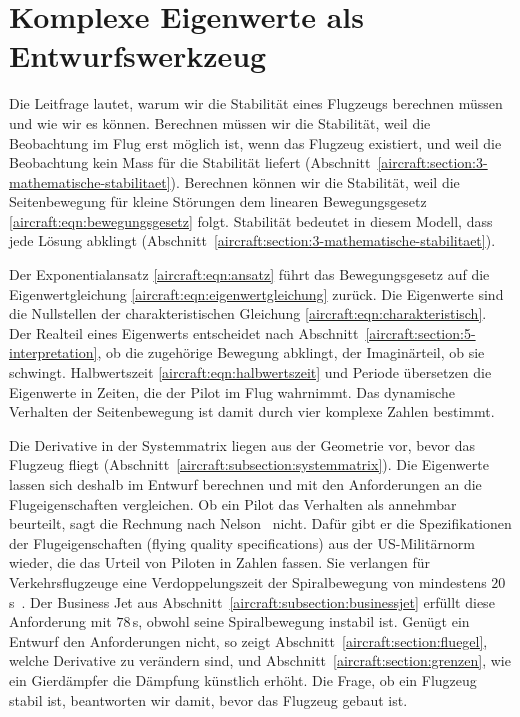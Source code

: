 %
%
%
%
%
\section{Komplexe Eigenwerte als Entwurfswerkzeug
\label{aircraft:section:fazit}}
Die Leitfrage lautet, warum wir die Stabilität eines Flugzeugs berechnen
müssen und wie wir es können.
Berechnen müssen wir die Stabilität, weil die Beobachtung im Flug erst möglich
ist, wenn das Flugzeug existiert, und weil die Beobachtung kein Mass für die
Stabilität liefert (Abschnitt~\ref{aircraft:section:3-mathematische-stabilitaet}).
Berechnen können wir die Stabilität, weil die Seitenbewegung für kleine
Störungen dem linearen Bewegungsgesetz \eqref{aircraft:eqn:bewegungsgesetz}
folgt.
Stabilität bedeutet in diesem Modell, dass jede Lösung abklingt
(Abschnitt~\ref{aircraft:section:3-mathematische-stabilitaet}).

Der Exponentialansatz \eqref{aircraft:eqn:ansatz} führt das Bewegungsgesetz
auf die Eigenwertgleichung \eqref{aircraft:eqn:eigenwertgleichung} zurück.
Die Eigenwerte sind die Nullstellen der charakteristischen Gleichung
\eqref{aircraft:eqn:charakteristisch}.
Der Realteil eines Eigenwerts entscheidet nach
Abschnitt~\ref{aircraft:section:5-interpretation}, ob die zugehörige Bewegung
abklingt, der Imaginärteil, ob sie schwingt.
Halbwertszeit \eqref{aircraft:eqn:halbwertszeit} und Periode übersetzen die
Eigenwerte in Zeiten, die der Pilot im Flug wahrnimmt.
Das dynamische Verhalten der Seitenbewegung ist damit durch vier komplexe
Zahlen bestimmt.

Die Derivative in der Systemmatrix liegen aus der Geometrie vor, bevor das
Flugzeug fliegt (Abschnitt~\ref{aircraft:subsection:systemmatrix}).
Die Eigenwerte lassen sich deshalb im Entwurf berechnen und mit den
Anforderungen an die Flugeigenschaften vergleichen.
Ob ein Pilot das Verhalten als annehmbar beurteilt, sagt die Rechnung
nach Nelson~\cite[Abschnitt 5.5]{aircraft:nelson} nicht.
Dafür gibt er die Spezifikationen der Flugeigenschaften (flying quality
specifications) aus der US-Militärnorm wieder, die das Urteil
von Piloten in Zahlen fassen.
Sie verlangen für Verkehrsflugzeuge eine Verdoppelungszeit der
Spiralbewegung von mindestens $20$\,s~\cite[Tabelle 5.4]{aircraft:nelson}.
Der Business Jet aus Abschnitt~\ref{aircraft:subsection:businessjet} erfüllt
diese Anforderung mit $78$\,s, obwohl seine Spiralbewegung instabil ist.
Genügt ein Entwurf den Anforderungen nicht, so zeigt
Abschnitt~\ref{aircraft:section:fluegel}, welche Derivative zu verändern sind,
und Abschnitt~\ref{aircraft:section:grenzen}, wie ein Gierdämpfer die Dämpfung
künstlich erhöht.
Die Frage, ob ein Flugzeug stabil ist, beantworten wir damit, bevor das
Flugzeug gebaut ist.
